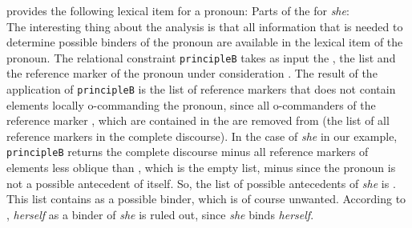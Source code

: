 \documentclass[output=paper
 	        ,biblatex
                ,babelshorthands
                ,newtxmath
                ,draftmode
                ,colorlinks, citecolor=brown
]{langscibook}
\begin{document}
\citet[]{Branco2002a} provides the following lexical item for a pronoun:
\eas
Parts of the \synsemv for \emph{she}:\\
\zs
The interesting thing about the analysis is that all information that is needed to determine
possible binders of the pronoun are available in the lexical item of the pronoun. The relational
constraint \texttt{principleB} takes as input the \listal {}, the \listu list  and the reference marker
of the pronoun under consideration . The result of the application of \texttt{principleB} is the list
of reference markers that does not contain elements locally o-commanding the pronoun, since all
o-commanders of the reference marker , which are contained in the \lista are removed from \listu (the
list of all reference markers in the complete discourse). In the case of \emph{she} in our example,
\texttt{principleB} returns the complete discourse  minus all reference markers of elements less oblique than , which is the empty
list, minus  since the pronoun is not a possible antecedent of itself. So, the list of
possible antecedents of \emph{she} is . This list
contains  as a possible binder, which is of course unwanted. According to
\citet[]{Branco2002a}, \emph{herself} as a binder of \emph{she} is ruled out, since
\emph{she} binds \emph{herself}.
\end{document}

